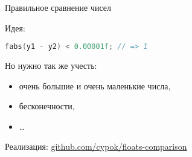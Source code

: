 \begin{frame}[fragile]{Правильное сравнение чисел}

  Идея:
  \begin{lstlisting}[language=C]
fabs(y1 - y2) < 0.00001f; // => 1
  \end{lstlisting}

  \pause

  Но нужно так же учесть:
  \begin{itemize}
    \item очень большие и очень маленькие числа,
    \item бесконечности,
    \item \ldots
  \end{itemize}

  Реализация: \href{%
    https://github.com/cypok/floats-comparison%
  }{%
    github.com/cypok/floats-comparison
  }

\end{frame}



